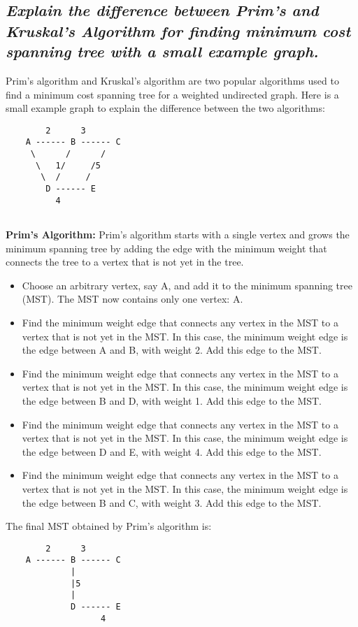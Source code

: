 \documentclass{article}
\begin{document}
\subsection{\textit{Explain the difference between Prim’s and Kruskal’s Algorithm for finding minimum
cost spanning tree with a small example graph.}}
Prim's algorithm and Kruskal's algorithm are two popular algorithms used to find a minimum cost spanning tree for a weighted undirected graph. Here is a small example graph to explain the difference between the two algorithms:
\begin{lstlisting}
		2      3
	A ------ B ------ C
	 \      /      /
	  \   1/     /5
	   \  /     /
		D ------ E
		  4
 
\end{lstlisting}
\textbf{Prim's Algorithm:} Prim's algorithm starts with a single vertex and grows the minimum spanning tree by adding the edge with the minimum weight that connects the tree to a vertex that is not yet in the tree.
\begin{itemize}
	\item Choose an arbitrary vertex, say A, and add it to the minimum spanning tree (MST). The MST now contains only one vertex: {A}.
	\item Find the minimum weight edge that connects any vertex in the MST to a vertex that is not yet in the MST. In this case, the minimum weight edge is the edge between A and B, with weight 2. Add this edge to the MST.
	\item Find the minimum weight edge that connects any vertex in the MST to a vertex that is not yet in the MST. In this case, the minimum weight edge is the edge between B and D, with weight 1. Add this edge to the MST.
	\item Find the minimum weight edge that connects any vertex in the MST to a vertex that is not yet in the MST. In this case, the minimum weight edge is the edge between D and E, with weight 4. Add this edge to the MST.
	\item Find the minimum weight edge that connects any vertex in the MST to a vertex that is not yet in the MST. In this case, the minimum weight edge is the edge between B and C, with weight 3. Add this edge to the MST.
\end{itemize}
The final MST obtained by Prim's algorithm is:
\begin{lstlisting}
		2      3
	A ------ B ------ C
			 |      
			 |5     
			 |     
			 D ------ E
				   4
 
\end{lstlisting}
\end{document}
